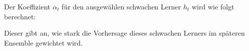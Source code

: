 Der Koeffizient $\alpha_t$ für den ausgewählen schwachen Lerner $h_t$ wird wie folgt berechnet:

Dieser gibt an, wie stark die Vorhersage dieses schwachen Lerners im späteren Ensemble
gewichtet wird.